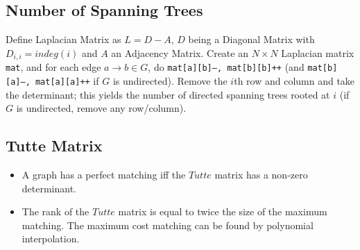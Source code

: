\subsection{Number of Spanning Trees}
		Define Laplacian Matrix as $L = D - A$, $D$ being a Diagonal Matrix with $D_{i,i} = indeg(i)$ and $A$ an Adjacency Matrix.
		Create an $N\times N$ Laplacian matrix \texttt{mat}, and for each edge $a \rightarrow b \in G$, do
		\texttt{mat[a][b]--, mat[b][b]++} (and \texttt{mat[b][a]--, mat[a][a]++} if $G$ is undirected).
		Remove the $i$th row and column and take the determinant; this yields the number of directed spanning trees rooted at $i$
		(if $G$ is undirected, remove any row/column).

\subsection{Tutte Matrix}
	\begin{itemize}
	\item A graph has a perfect matching iff the $Tutte$ matrix has a non-zero determinant.
	\item The rank of the $Tutte$ matrix is equal to twice the size of the maximum matching. The maximum cost matching can be found by polynomial interpolation.
	\end{itemize}



